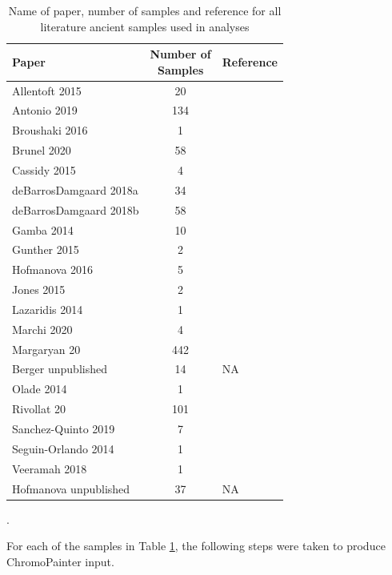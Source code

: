 \begin{table}
\centering
\begin{tabular}[t]{lcl}
\toprule
Paper & \thead{Number of\\ Samples} & Reference\\
\midrule
Allentoft 2015 & 20 & \cite{Allentoft2015}\\
Antonio 2019 & 134 & \cite{antonio2019ancient}\\
Broushaki 2016 & 1 & \cite{Broushaki2016b}\\
Brunel 2020 & 58 & \cite{Brunel12791}\\
Cassidy 2015 & 4 & \cite{Cassidy368}\\
deBarrosDamgaard 2018a & 34 & \cite{deBarrosDamgaardeaar7711}\\
deBarrosDamgaard 2018b & 58 & \cite{de2018137}\\
Gamba 2014 & 10 & \cite{Gamba2014}\\
Gunther 2015 & 2 & \cite{gunther2015ancient}\\
Hofmanova 2016 & 5 & \cite{Hofmanova2016}\\
Jones 2015 & 2 & \cite{Jones2015}\\
Lazaridis 2014 & 1 & \cite{Lazaridis2014}\\
Marchi 2020 & 4 & \cite{marchi2020mixed}\\
Margaryan 20 & 442 & \cite{margaryan2020population}\\
Berger unpublished & 14 & NA\\
Olade 2014 & 1 & \cite{olalde2014derived}\\
Rivollat 20 & 101 & \cite{rivollat2020france}\\
Sanchez-Quinto 2019 & 7 & \cite{sanchez2019megalithic}\\
Seguin-Orlando 2014 & 1 & \cite{Seguin-Orlando2014}\\
Veeramah 2018 & 1 & \cite{Veeramah2018}\\
Hofmanova unpublished & 37 & NA\\
\bottomrule
\end{tabular}
\caption{Name of paper, number of samples and reference for all literature ancient samples used in analyses}.
\label{tab:AncientReferenceDataset}
\end{table}

For each of the samples in Table \ref{tab:AncientReferenceDataset}, the following steps were taken to produce ChromoPainter input.

